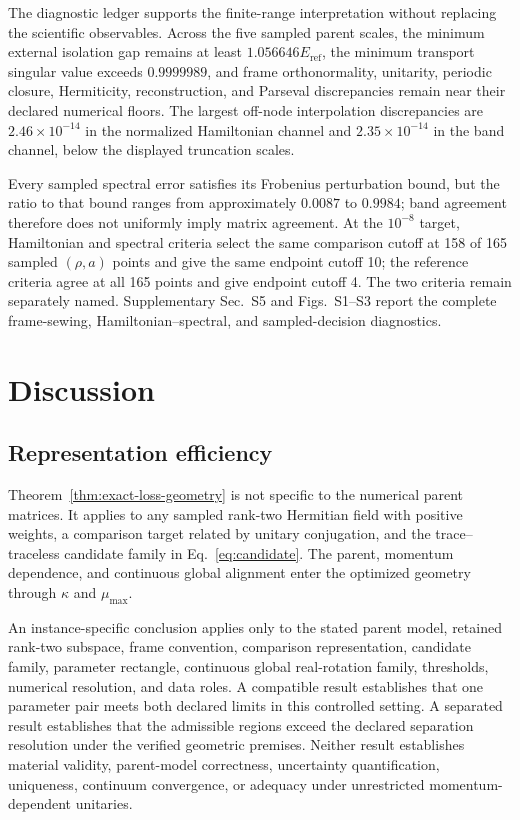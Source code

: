 \documentclass[aps,prb,reprint,amsmath,amssymb,longbibliography,floatfix]{revtex4-2}
\begin{document}
The diagnostic ledger supports the finite-range interpretation without replacing the
scientific observables. Across the five sampled parent scales, the minimum external isolation gap
remains at least $1.056646E_{\mathrm{ref}}$, the minimum transport singular value exceeds
$0.9999989$, and frame orthonormality, unitarity, periodic closure, Hermiticity,
reconstruction, and Parseval discrepancies remain near their declared numerical floors. The
largest off-node interpolation discrepancies are $2.46\times10^{-14}$ in the normalized
Hamiltonian channel and $2.35\times10^{-14}$ in the band channel, below the displayed
truncation scales.

Every sampled spectral error satisfies its Frobenius perturbation bound, but the ratio
to that bound ranges from approximately $0.0087$ to $0.9984$; band agreement therefore
does not uniformly imply matrix agreement. At the $10^{-8}$ target, Hamiltonian and
spectral criteria select the same comparison cutoff at 158 of 165 sampled $(\rho,a)$
points and give the same endpoint cutoff 10; the reference criteria agree at all 165
points and give endpoint cutoff 4. The two criteria remain separately
named. Supplementary Sec.~S5 and Figs.~S1--S3 report the complete frame-sewing,
Hamiltonian--spectral, and sampled-decision diagnostics.

\section{Discussion}

\subsection{Representation efficiency}

Theorem~\ref{thm:exact-loss-geometry} is not specific to the numerical parent matrices.
It applies to any sampled rank-two Hermitian field with positive weights, a comparison
target related by unitary conjugation, and the trace--traceless candidate family in
Eq.~\eqref{eq:candidate}. The parent, momentum dependence, and continuous global
alignment enter the optimized geometry through $\kappa$ and $\mu_{\max}$.

An instance-specific conclusion applies only to the stated parent model, retained
rank-two subspace, frame convention, comparison representation, candidate family,
parameter rectangle, continuous global real-rotation family, thresholds, numerical
resolution, and data roles. A compatible result establishes that one parameter pair
meets both declared limits in this controlled setting. A separated result establishes
that the admissible regions exceed the declared separation resolution under the verified
geometric premises. Neither result establishes material validity, parent-model
correctness, uncertainty quantification, uniqueness, continuum convergence, or adequacy
under unrestricted momentum-dependent unitaries.
\end{document}
